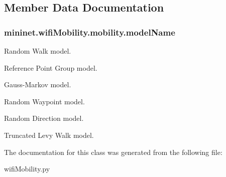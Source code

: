 \subsection{Member Data Documentation}
\hypertarget{classmininet_1_1wifiMobility_1_1mobility_a3eddb97d5e1bd75aa2fb5246204329aa}{
\subsubsection[{model\-Name}]{\setlength{\rightskip}{0pt plus 5cm}mininet.\-wifi\-Mobility.\-mobility.\-model\-Name}}\label{classmininet_1_1wifiMobility_1_1mobility_a3eddb97d5e1bd75aa2fb5246204329aa}


Random Walk model. 

Reference Point Group model.

Gauss-\/\-Markov model.

Random Waypoint model.

Random Direction model.

Truncated Levy Walk model. 

The documentation for this class was generated from the following file\-:\begin{DoxyCompactItemize}
\item 
wifi\-Mobility.\-py\end{DoxyCompactItemize}
